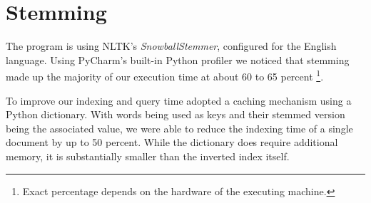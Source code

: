 \section{Stemming}
\label{sec:stemming}

The program is using NLTK's \textit{SnowballStemmer}, configured for the English language.
Using PyCharm's built-in Python profiler we noticed that stemming made up the majority of our execution time at about 60 to 65 percent \footnote{Exact percentage depends on the hardware of the executing machine.}.

To improve our indexing and query time adopted a caching mechanism using a Python dictionary.
With words being used as keys and their stemmed version being the associated value, we were able to reduce the indexing time of a single document by up to 50 percent.
While the dictionary does require additional memory, it is substantially smaller than the inverted index itself.
